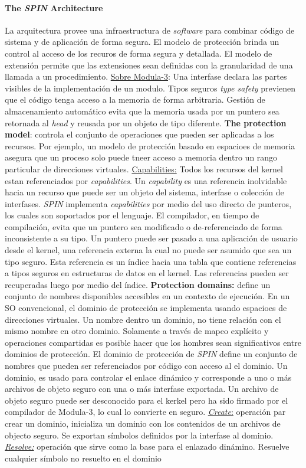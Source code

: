\paragraph{\textnormal{\textbf{The \textit{SPIN} Architecture}}}
La arquitectura provee una infraestructura de \textit{software} para combinar código de sistema y de aplicación de forma segura. El modelo de protección brinda un control al acceso de los recuros de forma segura y detallada. El modelo de extensión permite que las extensiones sean definidas con la granularidad de una llamada a un procedimiento. \underline{Sobre Modula-3}: Una interfase declara las partes visibles de la implementación de un modulo. Tipos seguros \textit{type safety} previenen que el código tenga acceso a la memoria de forma arbitraria. Gestión de almacenamiento automático evita que la memoria usada por un puntero sea retornada al \textit{head} y reusada por un objeto de tipo diferente.  \textbf{The protection model}: controla el conjunto de operaciones que pueden ser aplicadas a los recursos. Por ejemplo, un modelo de protección basado en espacioes de memoria asegura que un proceso solo puede tneer acceso a memoria dentro un rango particular de direcciones virtuales. \underline{Capabilities:} Todos los recursos del kernel estan referenciados por \textit{capabilities}. Un \textit{capability} es una referencia inolvidable hacia un recurso que puede ser un objeto del sistema, interfase o colección de interfases. \textit{SPIN} implementa \textit{capabilities} por medio del uso directo de punteros, los cuales son soportados por el lenguaje. El compilador, en tiempo de compilación, evita que un puntero sea modificado o de-referenciado de forma inconsistente a su tipo. Un puntero puede ser pasado a una aplicación de usuario desde el kernel, una referencia externa la cual no puede ser asumido que sea un tipo seguro. Esta referencia es un índice hacia una tabla que contiene referencias a tipos seguros en estructuras de datos en el kernel. Las referencias pueden ser recuperadas luego por medio del índice. \textbf{Protection domains:} define un conjunto de nombres disponibles accesibles en un contexto de ejecución. En un SO convencional, el dominio de protección se implementa usando espacioes de direcciones virtuales. Un nombre dentro un dominio, no tiene relación con el mismo nombre en otro dominio. Solamente a través de mapeo explícito y operaciones compartidas es posible hacer que los hombres sean significativos entre dominios de protección. El dominio de protección de \textit{SPIN} define un conjunto de nombres que pueden ser referenciados por código con acceso al el dominio. Un dominio, es usado para controlar el enlace dinámico y corresponde a uno o más archivos de objeto seguro con una o más interfase exportada. Un archivo de objeto seguro puede ser desconocido para el kerkel pero ha sido firmado por el compilador de Modula-3, lo cual lo convierte en seguro. \underline{\textit{Create}:} operación par crear un dominio, inicializa un dominio con los contenidos de un archivos de objecto seguro. Se exportan símbolos definidos por la interfase al dominio. \underline{\textit{Resolve:}} operación que sirve como la base para el enlazado dinámino. Resuelve cualquier símbolo no resuelto en el dominio 